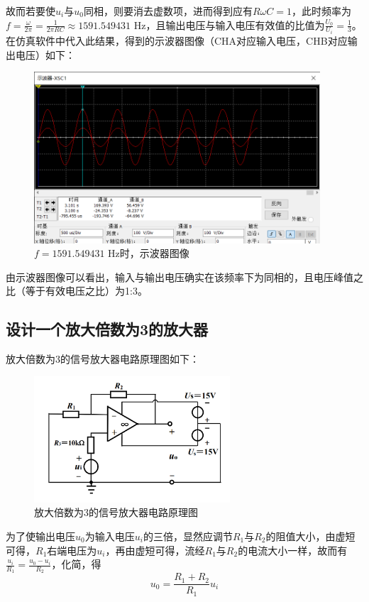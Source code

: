 \documentclass[UTF8]{ctexart}
\begin{document}
故而若要使$u_i$与$u_0$同相，则要消去虚数项，进而得到应有$R\omega C=1$，此时频率为$f=\frac{\omega}{2\pi}=\frac{1}{2\pi RC}\approx1591.549431$ Hz，且输出电压与输入电压有效值的比值为$\frac{U_0}{U_i}=\frac{1}{3}$。在仿真软件中代入此结果，得到的示波器图像（CHA对应输入电压，CHB对应输出电压）如下：
\begin{figure}[H]
\centering
\includegraphics[width=0.95\textwidth]{B.png}
\caption{$f=1591.549431$ Hz时，示波器图像}
\end{figure}

由示波器图像可以看出，输入与输出电压确实在该频率下为同相的，且电压峰值之比（等于有效电压之比）为1:3。
\subsection{设计一个放大倍数为3的放大器}
放大倍数为3的信号放大器电路原理图如下：
\begin{figure}[H]
\centering
\includegraphics[width=0.65\textwidth]{D.png}
\caption{放大倍数为3的信号放大器电路原理图}
\end{figure}

为了使输出电压$u_0$为输入电压$u_i$的三倍，显然应调节$R_1$与$R_2$的阻值大小，由虚短可得，$R_1$右端电压为$u_i$，再由虚短可得，流经$R_1$与$R_2$的电流大小一样，故而有$\frac{u_i}{R_1}=\frac{u_0-u_i}{R_2}$，化简，得
\begin{equation}
u_0=\frac{R_1+R_2}{R_1}u_i
\end{equation}
\end{document}
